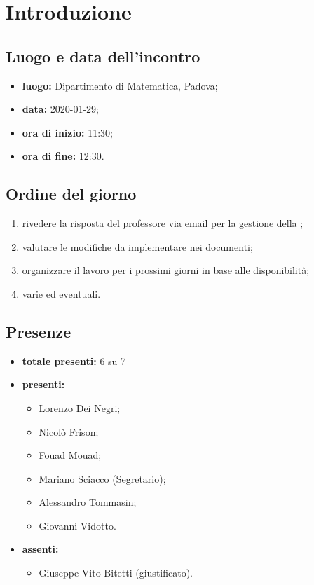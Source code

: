 \section*{Introduzione}

\subsection*{Luogo e data dell'incontro}
	\begin{itemize}
		\item \textbf{luogo:} Dipartimento di Matematica, Padova;
		\item \textbf{data:} 2020-01-29;
		\item \textbf{ora di inizio:} 11:30;
		\item \textbf{ora di fine:} 12:30.
	\end{itemize}

\subsection*{Ordine del giorno}
	\begin{enumerate}
			\item rivedere la risposta del professore via email per la gestione della ;
  			\item valutare le modifiche da implementare nei documenti;
  			\item organizzare il lavoro per i prossimi giorni in base alle disponibilità;
  			\item varie ed eventuali.
	\end{enumerate}

\subsection*{Presenze}
	\begin{itemize}
		\item \textbf{totale presenti:} 6 su 7
		\item \textbf{presenti: }
			\begin{itemize}			
				\item Lorenzo Dei Negri;
				\item Nicolò Frison;
				\item Fouad Mouad;
				\item Mariano Sciacco (Segretario);
				\item Alessandro Tommasin;
				\item Giovanni Vidotto.
			\end{itemize}
		\item \textbf{assenti: } 
			\begin{itemize}	
				\item Giuseppe Vito Bitetti (giustificato).
			\end{itemize}
	\end{itemize}



